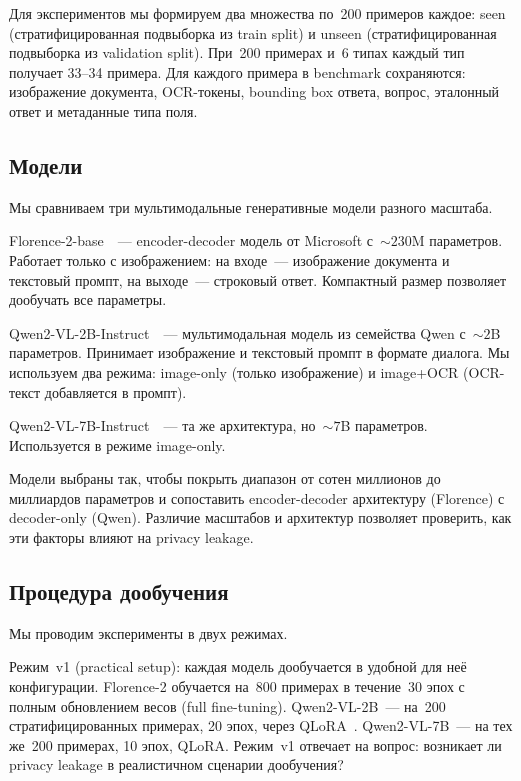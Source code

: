 \documentclass[a4paper,12pt]{extarticle}
\begin{document}
Для экспериментов мы формируем два множества по~200 примеров каждое: seen (стратифицированная подвыборка из train split) и unseen (стратифицированная подвыборка из validation split). При~200 примерах и~6 типах каждый тип получает 33--34 примера. Для каждого примера в benchmark сохраняются: изображение документа, OCR-токены, bounding box ответа, вопрос, эталонный ответ и метаданные типа поля.

\subsection{Модели}
\label{sec:models}

Мы сравниваем три мультимодальные генеративные модели разного масштаба.

Florence-2-base~\cite{florence2}~--- encoder-decoder модель от Microsoft с~${\sim}230$M параметров. Работает только с изображением: на входе~--- изображение документа и текстовый промпт, на выходе~--- строковый ответ. Компактный размер позволяет дообучать все параметры.

Qwen2-VL-2B-Instruct~\cite{qwen2vl}~--- мультимодальная модель из семейства Qwen с~${\sim}2$B параметров. Принимает изображение и текстовый промпт в формате диалога. Мы используем два режима: image-only (только изображение) и image+OCR (OCR-текст добавляется в промпт).

Qwen2-VL-7B-Instruct~\cite{qwen2vl}~--- та же архитектура, но~${\sim}7$B параметров. Используется в режиме image-only.

Модели выбраны так, чтобы покрыть диапазон от сотен миллионов до миллиардов параметров и сопоставить encoder-decoder архитектуру (Florence) с decoder-only (Qwen). Различие масштабов и архитектур позволяет проверить, как эти факторы влияют на privacy leakage.

\subsection{Процедура дообучения}
\label{sec:finetuning}

Мы проводим эксперименты в двух режимах.

Режим~v1 (practical setup): каждая модель дообучается в удобной для неё конфигурации. Florence-2 обучается на~800 примерах в течение~30 эпох с полным обновлением весов (full fine-tuning). Qwen2-VL-2B~--- на~200 стратифицированных примерах, 20 эпох, через QLoRA~\cite{qlora}. Qwen2-VL-7B~--- на тех же~200 примерах, 10 эпох, QLoRA. Режим~v1 отвечает на вопрос: возникает ли privacy leakage в реалистичном сценарии дообучения?
\end{document}
